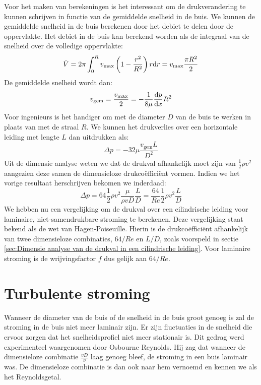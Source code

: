Voor het maken van berekeningen is het interessant om de drukverandering te kunnen schrijven in functie van de gemiddelde snelheid in de buis. We kunnen de gemiddelde snelheid in de buis berekenen door het debiet te delen door de oppervlakte. Het debiet in de buis kan berekend worden als de integraal van de snelheid over de volledige oppervlakte:
\begin{equation}
	\dot{V} = 2 \pi \int_0^R v_{\text{max}} \left(1- \frac{r^2}{R^2}\right) r \mathrm{d} r = v_{\text{max}} \frac{\pi R^2}{2}
\end{equation}
De gemiddelde snelheid wordt dan:
\begin{equation}
	v_{\text{gem}} = \frac{v_{\text{max}}}{2} = - \frac{1}{8 \mu}\frac{\mathrm{d} p}{\mathrm{d} x} R^2
\end{equation}
Voor ingenieurs is het handiger om met de diameter $D$ van de buis te werken in plaats van met de straal $R$. We kunnen het drukverlies over een horizontale leiding met lengte $L$ dan uitdrukken als:
\begin{equation}
	\Delta p = - 32 \mu \frac{v_{\text{gem}} L}{ D^2}
\end{equation}
Uit de dimensie analyse weten we dat de drukval afhankelijk moet zijn van $\frac{1}{2}\rho v^2$ aangezien deze samen de dimensieloze drukcoëfficiënt vormen. Indien we het vorige resultaat herschrijven bekomen we inderdaad:
\begin{equation}
	\Delta p = 64 \frac{1}{2}\rho v^2 \frac{\mu}{\rho v D} \frac{L}{D} = \frac{64}{Re} \frac{1}{2}\rho v^2 \frac{L}{D}
	\label{eqn:drukval bij laminaire stroming}
\end{equation}
We hebben nu een vergelijking om de drukval over een cilindrische leiding voor laminaire, niet-samendrukbare stroming te berekenen. Deze vergelijking staat bekend als de wet van Hagen-Poiseuille. Hierin is de drukcoëfficiënt afhankelijk van twee dimensieloze combinaties, $64/Re$ en $L/D$, zoals voorspeld in sectie \ref{sec:Dimensie analyse van de drukval in een cilindrische leiding}. Voor laminaire stroming is de wrijvingsfactor $f$ dus gelijk aan $64/Re$.

	\section{Turbulente stroming}
	\label{sec:Turbulente stroming}

Wanneer de diameter van de buis of de snelheid in de buis groot genoeg is zal de stroming in de buis niet meer laminair zijn. Er zijn fluctuaties in de snelheid die ervoor zorgen dat het snelheidsprofiel niet meer stationair is. Dit gedrag werd experimenteel waargenomen door Osbourne Reynolds. Hij zag dat wanneer de dimensieloze combinatie $\frac{v D}{\nu}$ laag genoeg bleef, de stroming in een buis laminair was. De dimensieloze combinatie is dan ook naar hem vernoemd en kennen we als het Reynoldsgetal.

